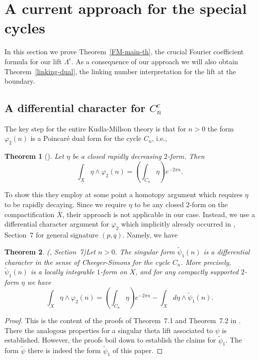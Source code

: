 \documentclass[12pt,leqno]{amsart}
\numberwithin{equation}{section}
\theoremstyle{plain}
\newtheorem{theorem}{Theorem}[section]
\theoremstyle{definition}
\theoremstyle{remark}
\begin{document}
 



\section{A current approach for the special cycles}\label{currents}

In this section we prove Theorem~\ref{FM-main-th}, the crucial Fourier coefficient formula for our lift $\Lambda^c$.  As a consequence of our approach we will also obtain Theorem~\ref{linking-dual}, the linking number interpretation for the lift at the boundary. 

\subsection{A differential character for $C_n^c$}

The key step for the entire Kudla-Millson theory is that for $n>0$ the form $\varphi_2(n)$ is a Poincar\'e dual form for the cycle $C_n$, i.e., 

\begin{theorem}[\cite{KM2,KMCan}]
Let $\eta$ be a closed rapidly decreasing $2$-form. Then 
\[
\int_X \eta \wedge  \varphi_2(n)= \left(\int_{C_n} \eta \right) e^{-2\pi n}.
\]
\end{theorem}

To show this they employ at some point a homotopy argument which requires $\eta$ to be rapidly decaying. Since we require $\eta$ to be any closed $2$-form on the compactification $\overline{X}$, their approach is not applicable in our case. Instead, we use a differential character argument for $\varphi_2$ which implicitly already occurred in \cite{BFDuke}, Section~7 for general signature $(p,q)$. Namely, we have

\begin{theorem} (\cite{BFDuke}, Section~7)\label{BrFu}
Let $n>0$. 
The singular form $ \tilde{\psi}_1(n)$ is a differential character in the sense of Cheeger-Simons for the cycle $C_n$. More precisely, $\tilde{\psi}_1(n)$ is a locally integrable $1$-form on $X$, and for any compactly supported $2$-form $\eta$ we have 
\[
\int_{X} \eta \wedge \varphi_2(n)  = \left(\int_{C_n}  \eta \right) e^{-2 \pi n}  - \int_{X}  d \eta\wedge \tilde{\psi}_1(n).
\]
\end{theorem}

\begin{proof}
This is the content of the proofs of Theorem~7.1 and Theorem~7.2 in \cite{BFDuke}. There the analogous properties for a singular theta lift associated to $\psi$ is established. However, the proofs boil down to establish the claims for $\tilde{\psi}_1$. The form $\tilde{\psi}$ there is indeed the form $\tilde{\psi}_1$ of this paper. 
\end{proof}
\end{document}
